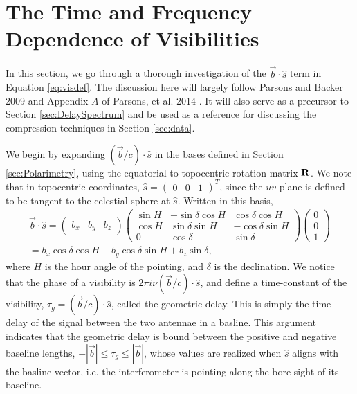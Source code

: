 \section{The Time and Frequency Dependence of Visibilities}
\label{sec:DDR}

In this section, we go through a thorough investigation of the $\vec{b}\cdot\hat{s}$ term in
Equation \ref{eq:visdef}. The discussion here will largely follow Parsons and Backer 2009 \cite{Parsons2009} 
and Appendix $A$ of Parsons, et al. 2014 \cite{Parsons2014}. It will also serve as a precursor to Section
\ref{sec:DelaySpectrum} and be used as a reference for discussing the compression
techniques in Section \ref{sec:data}.

We begin by expanding $(\vec{b}/c)\cdot\hat{s}$ in the bases defined in Section
\ref{sec:Polarimetry}, using the equatorial to topocentric rotation matrix $\mathbf{R}$. We note that in
topocentric coordinates, $\hat{s} = \begin{pmatrix}0&0&1\end{pmatrix}^T$, since the $uv$-plane is
defined to be tangent to the celestial sphere at $\hat{s}$. Written in this basis,
\begin{gather}
\vec{b}\cdot\hat{s} 
  = \begin{pmatrix}b_x&b_y&b_z\end{pmatrix}
    \begin{pmatrix}
      \sin H & -\sin\delta\cos H &  \cos\delta\cos H \\
      \cos H &  \sin\delta\sin H & -\cos\delta\sin H \\
      0      &  \cos\delta       &  \sin\delta
    \end{pmatrix}
  \begin{pmatrix}0\\0\\1\end{pmatrix}
   \nonumber \\ = 
 b_x\cos\delta\cos H -b_y\cos\delta\sin H +b_z\sin\delta,
\end{gather}
where $H$ is the hour angle of the pointing, and $\delta$ is the declination. We notice that the
phase of a visibility is $2\pi i \nu(\vec{b}/c)\cdot\hat{s}$, and define a time-constant of the
visibility, $\tau_g =
(\vec{b}/c)\cdot\hat{s}$, called the geometric delay. This is simply the time
delay of the signal between the two antennae in a basline. This argument indicates that the
geometric delay is bound between the positive and negative baseline lengths, $-|\vec{b}| \le \tau_g
\le |\vec{b}|$, whose values are realized when $\hat{s}$ aligns with the basline vector, i.e. the
interferometer is pointing along the bore sight of its baseline.

